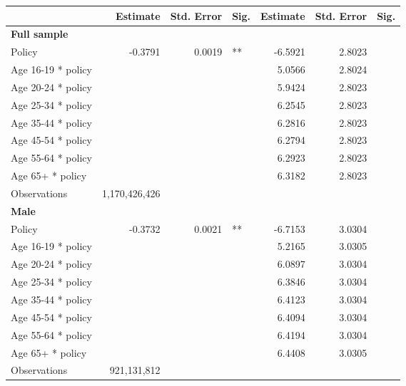 
\begin{table}%
\centering 
\begin{tabular}{l r r l r r l} 

\hline 
 
 & Estimate & Std. Error & Sig. & Estimate & Std. Error & Sig. \\ 

\hline 
 
\textbf{Full sample} \\ 

Policy             &  -0.3791        &  0.0019       &   **       &  -6.5921        &  2.8023       &            \\ 
Age 16-19 * policy           & & &  &  5.0566        &  2.8024       &            \\ 
Age 20-24 * policy           & & &  &  5.9424        &  2.8023       &            \\ 
Age 25-34 * policy           & & &  &  6.2545        &  2.8023       &            \\ 
Age 35-44 * policy           & & &  &  6.2816        &  2.8023       &            \\ 
Age 45-54 * policy           & & &  &  6.2794        &  2.8023       &            \\ 
Age 55-64 * policy           & & &  &  6.2923        &  2.8023       &            \\ 
Age 65+ * policy           & & &  &  6.3182        &  2.8023       &            \\ 
Observations & 1,170,426,426 \\ 


\hline 

\textbf{Male} \\ 

Policy             &  -0.3732        &  0.0021       &   **       &  -6.7153        &  3.0304       &            \\ 
Age 16-19 * policy           & & &  &  5.2165        &  3.0305       &            \\ 
Age 20-24 * policy           & & &  &  6.0897        &  3.0304       &            \\ 
Age 25-34 * policy           & & &  &  6.3846        &  3.0304       &            \\ 
Age 35-44 * policy           & & &  &  6.4123        &  3.0304       &            \\ 
Age 45-54 * policy           & & &  &  6.4094        &  3.0304       &            \\ 
Age 55-64 * policy           & & &  &  6.4194        &  3.0304       &            \\ 
Age 65+ * policy           & & &  &  6.4408        &  3.0305       &            \\ 
Observations & 921,131,812 \\ 



\end{tabular}
\end{table}
